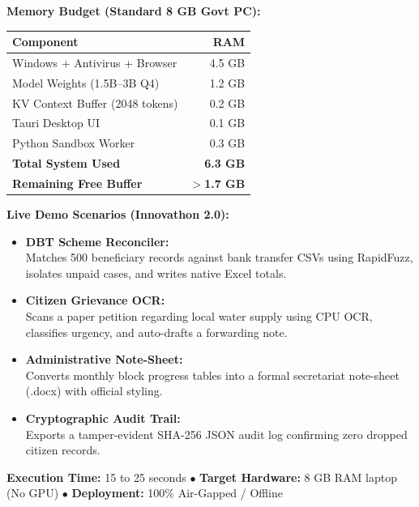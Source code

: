 \documentclass[11pt,a4paper]{article}
\begin{document}
\vspace{0.2cm}
\noindent
\begin{minipage}[t]{0.45\textwidth}
\textbf{Memory Budget (Standard 8 GB Govt PC):}\\[0.15cm]
\small
\begin{tabular}{p{4.2cm} r}
\toprule
\textbf{Component} & \textbf{RAM} \\
\midrule
Windows + Antivirus + Browser & 4.5 GB \\
Model Weights (1.5B--3B Q4) & 1.2 GB \\
KV Context Buffer (2048 tokens) & 0.2 GB \\
Tauri Desktop UI & 0.1 GB \\
Python Sandbox Worker & 0.3 GB \\
\midrule
\textbf{Total System Used} & \textbf{6.3 GB} \\
\textbf{Remaining Free Buffer} & \textbf{$>$1.7 GB} \\
\bottomrule
\end{tabular}
\end{minipage}
\hfill
\begin{minipage}[t]{0.50\textwidth}
\textbf{Live Demo Scenarios (Innovathon 2.0):}\\[0.15cm]
\small
\begin{itemize}[leftmargin=1.2em, itemsep=3.5pt]
    \item \textbf{DBT Scheme Reconciler:}\\ Matches 500 beneficiary records against bank transfer CSVs using RapidFuzz, isolates unpaid cases, and writes native Excel totals.
    \item \textbf{Citizen Grievance OCR:}\\ Scans a paper petition regarding local water supply using CPU OCR, classifies urgency, and auto-drafts a forwarding note.
    \item \textbf{Administrative Note-Sheet:}\\ Converts monthly block progress tables into a formal secretariat note-sheet (.docx) with official styling.
    \item \textbf{Cryptographic Audit Trail:}\\ Exports a tamper-evident SHA-256 JSON audit log confirming zero dropped citizen records.
\end{itemize}
\end{minipage}

\vspace{0.4cm}
\begin{center}
\small
\textbf{Execution Time:} 15 to 25 seconds \quad $\bullet$ \quad
\textbf{Target Hardware:} 8 GB RAM laptop (No GPU) \quad $\bullet$ \quad
\textbf{Deployment:} 100\% Air-Gapped / Offline
\end{center}
\end{document}
